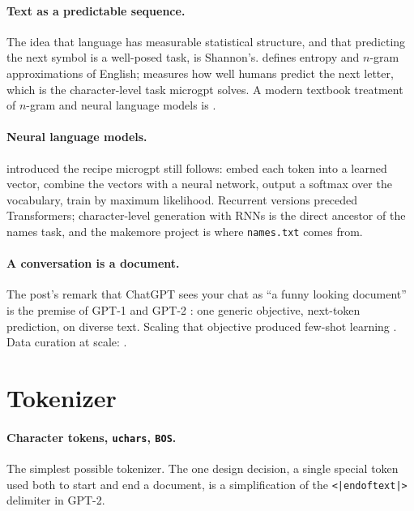 \documentclass[10pt,letterpaper]{article}
\newcommand{\BOS}{\texttt{BOS}}
\newcounter{q}
\begin{document}
\paragraph{Text as a predictable sequence.} The idea that language has measurable statistical structure, and that predicting the next symbol is a well-posed task, is Shannon's. \textcite{shannon1948mathematical} defines entropy and $n$-gram approximations of English; \textcite{shannon1951prediction} measures how well humans predict the next letter, which is the character-level task microgpt solves. A modern textbook treatment of $n$-gram and neural language models is \textcite{jurafsky2025slp}.

\paragraph{Neural language models.} \textcite{bengio2003neural} introduced the recipe microgpt still follows: embed each token into a learned vector, combine the vectors with a neural network, output a softmax over the vocabulary, train by maximum likelihood. Recurrent versions \parencite{elman1990finding,mikolov2010rnnlm,hochreiter1997lstm} preceded Transformers; character-level generation with RNNs \parencite{sutskever2011generating,graves2013generating,karpathy2015rnn} is the direct ancestor of the names task, and the makemore project \parencite{karpathy2022makemore} is where \texttt{names.txt} comes from.

\paragraph{A conversation is a document.} The post's remark that ChatGPT sees your chat as ``a funny looking document'' is the premise of GPT-1 and GPT-2 \parencite{radford2018gpt1,radford2019gpt2}: one generic objective, next-token prediction, on diverse text. Scaling that objective produced few-shot learning \parencite{brown2020gpt3}. Data curation at scale: \textcite{raffel2020t5,gao2020pile,lee2022dedup,penedo2024fineweb}.

\section{Tokenizer}

\paragraph{Character tokens, \texttt{uchars}, \BOS.} The simplest possible tokenizer. The one design decision, a single special token used both to start and end a document, is a simplification of the \texttt{<|endoftext|>} delimiter in GPT-2.
\end{document}

